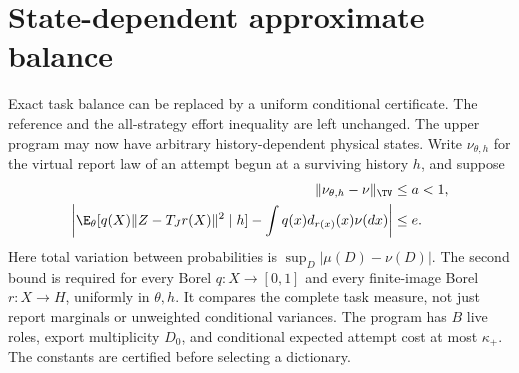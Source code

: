 \section{State-dependent approximate balance}
\label{sec:approx}
Exact task balance can be replaced by a uniform conditional certificate. The reference and the all-strategy effort inequality are left unchanged. The upper program may now have arbitrary history-dependent physical states. Write $\nu_{\theta,h}$ for the virtual report law of an attempt begun at a surviving history $h$, and suppose
\begin{align}
 \|\nu_{\theta,h}-\nu\|_{\TV}&\le a<1,\label{eq:approx-mass}\\
 \left|\E_\theta[q(X)\|Z-T_Jr(X)\|^2\mid h]
       -\int q(x)d_{r(x)}(x)\nu(dx)\right|&\le e.\label{eq:approx-task}
\end{align}
Here total variation between probabilities is $\sup_D|\mu(D)-\nu(D)|$. The second bound is required for every Borel $q:X\to[0,1]$ and every finite-image Borel $r:X\to H$, uniformly in $\theta,h$. It compares the complete task measure, not just report marginals or unweighted conditional variances. The program has $B$ live roles, export multiplicity $D_0$, and conditional expected attempt cost at most $\kappa_+$. The constants are certified before selecting a dictionary.

